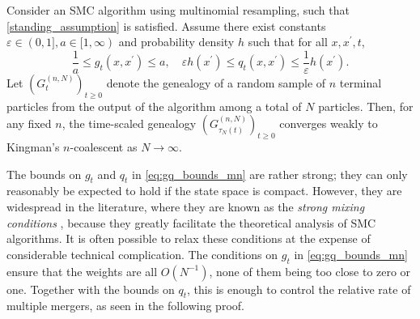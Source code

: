 \begin{corollary}\label{thm:multinomial}
Consider an SMC algorithm using multinomial resampling, such that \ref{standing_assumption} is satisfied. Assume there exist constants $\varepsilon\in (0,1], a\in [1,\infty)$ and probability density $h$ such that for all $x, x^\prime, t$,
\begin{equation}\label{eq:gq_bounds_mn}
\frac{1}{a} \leq g_t(x, x^\prime) \leq a , \quad
\varepsilon h(x^\prime) \leq q_t(x, x^\prime) \leq \frac{1}{\varepsilon} h(x^\prime) .
\end{equation}
Let $(G_t^{(n,N)})_{t\geq0}$ denote the genealogy of a random sample of $n$ terminal particles from the output of the algorithm among a total of $N$ particles. Then, for any fixed $n$, the time-scaled genealogy $(G_{\tau_N(t)}^{(n,N)})_{t\geq0}$ converges weakly to Kingman's $n$-coalescent as $N\to \infty$.%
\end{corollary}
The bounds on $g_t$ and $q_t$ in \eqref{eq:gq_bounds_mn} are rather strong; they can only reasonably be expected to hold if the state space is compact. 
However, they are widespread in the literature, where they are known as the \emph{strong mixing conditions} \parencite[Section 3.5.2]{delmoral2004}, because they greatly facilitate the theoretical analysis of SMC algorithms. It is often possible to relax these conditions at the expense of considerable technical complication.
The conditions on $g_t$ in \eqref{eq:gq_bounds_mn} ensure that the weights are all $O(N^{-1})$, none of them being too close to zero or one. Together with the bounds on $q_t$, this is enough to control the relative rate of multiple mergers, as seen in the following proof.

